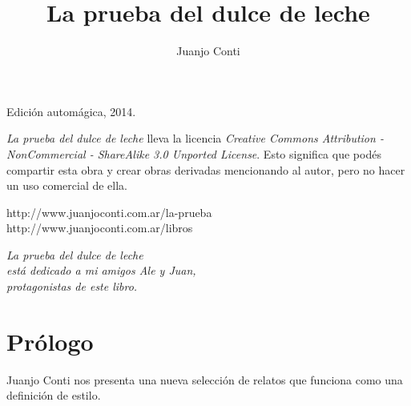 \documentclass[12pt,twoside,openright,a5paper]{book}
\title{La prueba del dulce de leche}
\author{Juanjo Conti}
\date{}
\begin{document}
\pagestyle{plain}

\maketitle


\thispagestyle{empty}
\noindent
Edición automágica, 2014.\\

\vspace{0.5cm}

\noindent
\emph{La prueba del dulce de leche} lleva la licencia 
\emph{Creative Commons Attribution - NonCommercial - ShareAlike 3.0 Unported License}.
Esto significa que podés compartir esta obra y crear obras derivadas
mencionando al autor, pero no ha\-cer un uso comercial de ella.

\vfill

\noindent
http://www.juanjoconti.com.ar/la-prueba\\

\noindent
http://www.juanjoconti.com.ar/libros

\cleardoublepage

\noindent
\begin{flushright}
\emph{
\emph{La prueba del dulce de leche}\\
está dedicado a mi amigos Ale y Juan,\\
protagonistas de este libro.
}
\end{flushright}

\cleardoublepage

\renewcommand*\contentsname{Índice}

\tableofcontents

\chapter*{Prólogo}

Juanjo Conti nos presenta una nueva selección de relatos que funciona como una definición de estilo.
\end{document}
